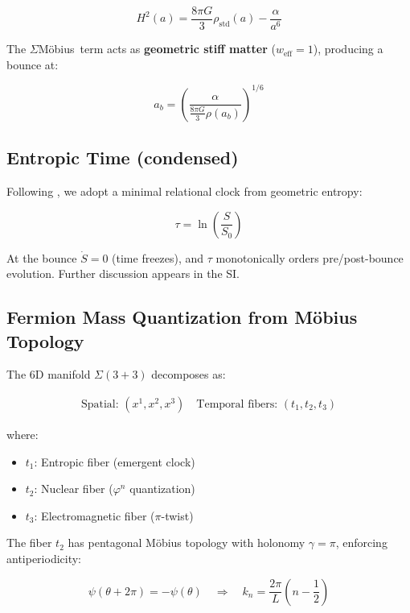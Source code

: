 \documentclass[12pt]{article}
\theoremstyle{definition}
\theoremstyle{plain}
\newcommand{\Moebius}{M\"obius}
\newcommand{\SigMoeb}{\ensuremath{\Sigma}\text{--}\Moebius}
\begin{document}
\begin{equation}
\boxed{H^2(a) = \frac{8\pi G}{3}\rho_{\text{std}}(a) - \frac{\alpha}{a^6}}
\end{equation}

The \SigMoeb\ term acts as \textbf{geometric stiff matter} ($w_{\text{eff}} = 1$), producing a bounce at:

\begin{equation}
a_b = \left(\frac{\alpha}{\frac{8\pi G}{3}\rho(a_b)}\right)^{1/6}
\end{equation}

\subsection{Entropic Time (condensed)}

Following \cite{rovelli2004,thooft1996}, we adopt a minimal relational clock from geometric entropy:

\begin{equation}
\boxed{\tau = \ln\!\left(\frac{S}{S_0}\right)}
\end{equation}

At the bounce $\dot{S}=0$ (time freezes), and $\tau$ monotonically orders pre/post-bounce evolution. Further discussion appears in the SI.

\subsection{Fermion Mass Quantization from M\"obius Topology}

The 6D manifold $\Sigma(3+3)$ decomposes as:

\begin{align}
\text{Spatial: } (x^1, x^2, x^3) \quad \text{Temporal fibers: } (t_1, t_2, t_3)
\end{align}

where:
\begin{itemize}
\item \textbf{$t_1$}: Entropic fiber (emergent clock)
\item \textbf{$t_2$}: Nuclear fiber ($\varphi^n$ quantization)
\item \textbf{$t_3$}: Electromagnetic fiber ($\pi$-twist)
\end{itemize}

The fiber $t_2$ has pentagonal M\"obius topology with holonomy $\gamma = \pi$, enforcing antiperiodicity:

\begin{equation}
\psi(\theta + 2\pi) = -\psi(\theta) \quad \Rightarrow \quad k_n = \frac{2\pi}{L}\left(n - \frac{1}{2}\right)
\end{equation}
\end{document}
